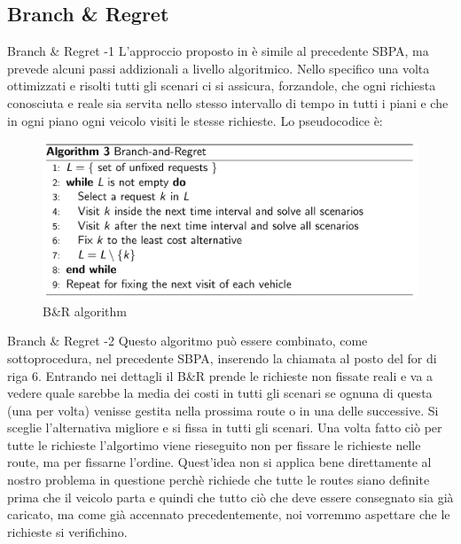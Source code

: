 \documentclass[10pt]{beamer}
\begin{document}
    \subsection{Branch \& Regret}\label{sec:b-and-r}
    \begin{frame}{Branch \& Regret -1}
        L'approccio proposto in \textcite{BRH} è simile al precedente SBPA, ma prevede alcuni passi addizionali a livello algoritmico. Nello specifico una volta ottimizzati e risolti tutti gli scenari ci si assicura, forzandole, che ogni richiesta conosciuta e reale sia servita nello stesso intervallo di tempo in tutti i piani e che in ogni piano ogni veicolo visiti le stesse richieste. Lo pseudocodice è:
        \begin{figure}[h!]
            \centering
            \includegraphics[scale=0.22]{Images/Branch-and-RegretAlg.png}
            \caption{B\&R algorithm}
            \label{fig:EditDistance}
        \end{figure}
    \end{frame}

    \begin{frame}{Branch \& Regret -2}
        Questo algoritmo può essere combinato, come sottoprocedura, nel precedente SBPA, inserendo la chiamata al posto del for di riga 6. Entrando nei dettagli il B\&R prende le richieste non fissate reali e va a vedere quale sarebbe la media dei costi in tutti gli scenari se ognuna di questa (una per volta) venisse gestita nella prossima route o in una delle successive. Si sceglie l'alternativa migliore e si fissa in tutti gli scenari. Una volta fatto ciò per tutte le richieste l'algortimo viene rieseguito non per fissare le richieste nelle route, ma per fissarne l'ordine. Quest'idea non si applica bene direttamente al nostro problema in questione perchè richiede che tutte le routes siano definite prima che il veicolo parta e quindi che tutto ciò che deve essere consegnato sia già caricato, ma come già accennato precedentemente, noi vorremmo aspettare che le richieste si verifichino.
    \end{frame}
\end{document}
